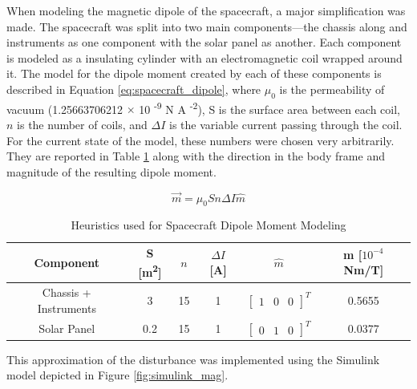 When modeling the magnetic dipole of the spacecraft, a major simplification was made. The spacecraft was split into two main components---the chassis along and instruments as one component with the solar panel as another. Each component is modeled as a insulating cylinder with an electromagnetic coil wrapped around it. The model for the dipole moment created by each of these components is described in Equation \ref{eq:spacecraft_dipole}, where $\mu_0$ is the permeability of vacuum (1.25663706212 $\times$ 10 \textsuperscript{-9} N A \textsuperscript{-2}), S is the surface area between each coil, $n$ is the number of coils, and $\Delta I$ is the variable current passing through the coil. For the current state of the model, these numbers were chosen very arbitrarily. They are reported in Table \ref{tab:spacecraft_dipole_data} along with the direction in the body frame and magnitude of the resulting dipole moment.

\begin{equation} \label{eq:spacecraft_dipole}
    \vec{m} = \mu_0 S n \Delta I \hat{m}
\end{equation}

\begin{table}[H]
    \centering
    \captionsetup{justification = centering}
    \begin{tabular}{c|ccccc}
    Component  & S [m\textsuperscript{2}] & $n$ & $\Delta I$ [A] & $\hat{m}$  & m [$10^{-4}$ Nm/T] \\ \hline
    Chassis + Instruments &   3     &   15    &   1    &   $\begin{bmatrix}  1 & 0 & 0  \end{bmatrix}^T$    &  0.5655 \\
    Solar Panel &   0.2     &  15    &   1    &    $\begin{bmatrix}  0 & 1 & 0  \end{bmatrix}^T$   &  0.0377  \\  
    \end{tabular}
    \caption{Heuristics used for Spacecraft Dipole Moment Modeling}
    \label{tab:spacecraft_dipole_data}
\end{table}

This approximation of the disturbance was implemented using the Simulink model depicted in Figure \ref{fig:simulink_mag}.

